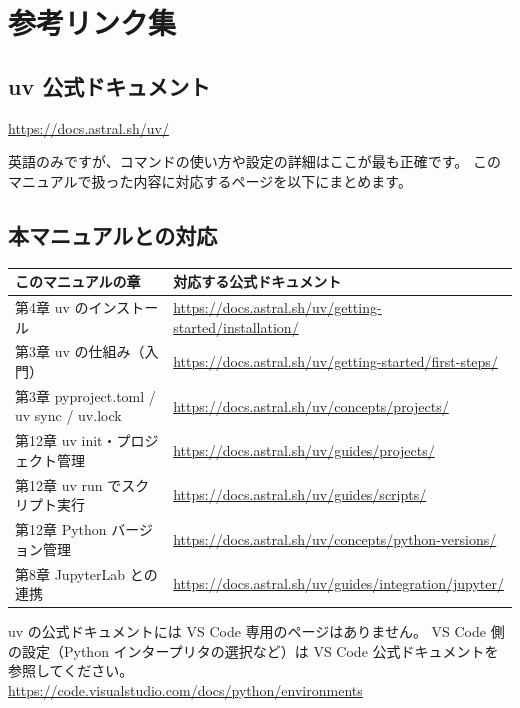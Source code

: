\chapter{参考リンク集}

\section{uv 公式ドキュメント}

\url{https://docs.astral.sh/uv/}

英語のみですが、コマンドの使い方や設定の詳細はここが最も正確です。
このマニュアルで扱った内容に対応するページを以下にまとめます。

\section{本マニュアルとの対応}

\begin{center}
\begin{tabularx}{\linewidth}{lX}
  \toprule
  このマニュアルの章 & 対応する公式ドキュメント \\
  \midrule
  第4章 uv のインストール &
    \url{https://docs.astral.sh/uv/getting-started/installation/} \\[0.5em]
  第3章 uv の仕組み（入門） &
    \url{https://docs.astral.sh/uv/getting-started/first-steps/} \\[0.5em]
  第3章 pyproject.toml / uv sync / uv.lock &
    \url{https://docs.astral.sh/uv/concepts/projects/} \\[0.5em]
  第12章 uv init・プロジェクト管理 &
    \url{https://docs.astral.sh/uv/guides/projects/} \\[0.5em]
  第12章 uv run でスクリプト実行 &
    \url{https://docs.astral.sh/uv/guides/scripts/} \\[0.5em]
  第12章 Python バージョン管理 &
    \url{https://docs.astral.sh/uv/concepts/python-versions/} \\[0.5em]
  第8章 JupyterLab との連携 &
    \url{https://docs.astral.sh/uv/guides/integration/jupyter/} \\
  \bottomrule
\end{tabularx}
\end{center}

\begin{notebox}
uv の公式ドキュメントには VS Code 専用のページはありません。
VS Code 側の設定（Python インタープリタの選択など）は
VS Code 公式ドキュメントを参照してください。\\[0.5em]
\url{https://code.visualstudio.com/docs/python/environments}
\end{notebox}
